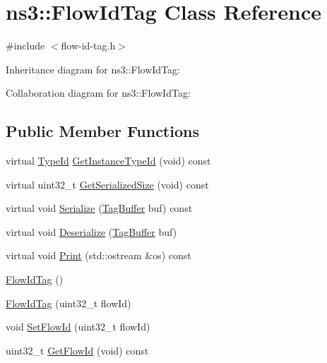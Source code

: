 \hypertarget{classns3_1_1FlowIdTag}{}\section{ns3\+:\+:Flow\+Id\+Tag Class Reference}
\label{classns3_1_1FlowIdTag}


{\ttfamily \#include $<$flow-\/id-\/tag.\+h$>$}



Inheritance diagram for ns3\+:\+:Flow\+Id\+Tag\+:


Collaboration diagram for ns3\+:\+:Flow\+Id\+Tag\+:
\subsection*{Public Member Functions}
\begin{DoxyCompactItemize}
\item 
virtual \hyperlink{classns3_1_1TypeId}{Type\+Id} \hyperlink{classns3_1_1FlowIdTag_a45804ffb6733bbc9270273f938383e61}{Get\+Instance\+Type\+Id} (void) const 
\item 
virtual uint32\+\_\+t \hyperlink{classns3_1_1FlowIdTag_ab1cb2b8613dbe612a4bb31d05ab4571a}{Get\+Serialized\+Size} (void) const 
\item 
virtual void \hyperlink{classns3_1_1FlowIdTag_ae0e257200e8191c57ae464fe6900a4a0}{Serialize} (\hyperlink{classns3_1_1TagBuffer}{Tag\+Buffer} buf) const 
\item 
virtual void \hyperlink{classns3_1_1FlowIdTag_a9f5e7dc6adcb186da2e0313f26f27277}{Deserialize} (\hyperlink{classns3_1_1TagBuffer}{Tag\+Buffer} buf)
\item 
virtual void \hyperlink{classns3_1_1FlowIdTag_aa4380ecb3de8c79b0f46a535a9d0f7e8}{Print} (std\+::ostream \&os) const 
\item 
\hyperlink{classns3_1_1FlowIdTag_a747a1d4feb42615026080b850e07add6}{Flow\+Id\+Tag} ()
\item 
\hyperlink{classns3_1_1FlowIdTag_af209bf4024f5962645547696b8e77b83}{Flow\+Id\+Tag} (uint32\+\_\+t flow\+Id)
\item 
void \hyperlink{classns3_1_1FlowIdTag_aa3fbbd15183e3e549f6205aabc4f2ab4}{Set\+Flow\+Id} (uint32\+\_\+t flow\+Id)
\item 
uint32\+\_\+t \hyperlink{classns3_1_1FlowIdTag_a8991e99516c2f5bb1d0f93af160f14e6}{Get\+Flow\+Id} (void) const 
\end{DoxyCompactItemize}
